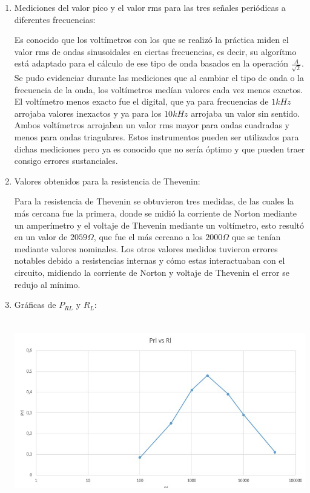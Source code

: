\documentclass[12pt]{article}
\begin{document}
	\begin{enumerate}
		
		\item Mediciones del valor pico y el valor
		rms para las tres señales periódicas a diferentes frecuencias:
		
		\noindent Es conocido que los voltímetros con los que se realizó la práctica miden el valor rms de ondas sinusoidales en ciertas frecuencias, es decir, su algorítmo está adaptado para el cálculo de ese tipo de onda basados en la operación $\frac{A}{\sqrt{2}}$.\\
		
		\noindent Se pudo evidenciar durante las mediciones que al cambiar el tipo de onda o la frecuencia de la onda, los voltímetros medían valores cada vez menos exactos. El voltímetro menos exacto fue el digital, que ya para frecuencias de $1kHz$ arrojaba valores inexactos y ya para los $10kHz$ arrojaba un valor sin sentido.\\
		
		\noindent Ambos voltímetros arrojaban un valor rms mayor para ondas cuadradas y menos para ondas triagulares. Estos instrumentos pueden ser utilizados para dichas mediciones pero ya es conocido que no sería óptimo y que pueden traer consigo errores sustanciales.
		
		\item Valores obtenidos para la resistencia de Thevenin:
		
		\noindent Para la resistencia de Thevenin se obtuvieron tres medidas, de las cuales la más cercana fue la primera, donde se midió la corriente de Norton mediante un amperímetro y el voltaje de Thevenin mediante un voltímetro, esto resultó en un valor de $2059\Omega$, que fue el más cercano a los $2000\Omega$ que se tenían mediante valores nominales. Los otros valores medidos tuvieron errores notables debido a resistencias internas y cómo estas interactuaban con el circuito, midiendo la corriente de Norton y voltaje de Thevenin el error se redujo al mínimo.
		
		\item Gráficas de $P_{RL}$ y $R_L$:
		
		\begin{center}
			\includegraphics[width=16cm,height=8cm]{Img/graph_1}
		\end{center}
	

\end{enumerate}
\end{document}
